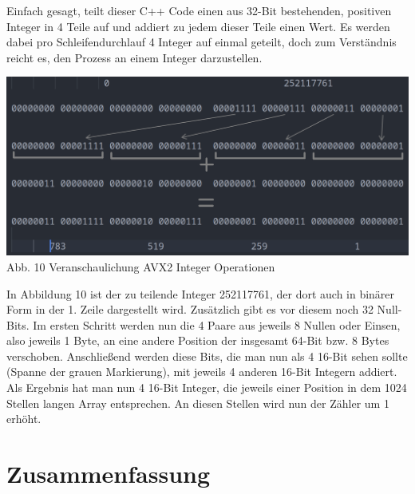 \documentclass[10pt,a4paper]{article}
\begin{document}
Einfach gesagt, teilt dieser C++ Code einen aus 32-Bit bestehenden, positiven Integer in 4 Teile auf und addiert
zu jedem dieser Teile einen Wert. Es werden dabei pro Schleifendurchlauf 4 Integer auf einmal geteilt, doch zum Verständnis reicht es,
den Prozess an einem Integer darzustellen.

\begin{center}
    \includegraphics[width=1\textwidth]{./diagramme/matplotlib/avx2explanationfull.png}
    Abb. 10 Veranschaulichung AVX2 Integer Operationen
\end{center}

In Abbildung 10 ist der zu teilende Integer 252117761, der dort auch in binärer Form in der 1. Zeile
dargestellt wird. Zusätzlich gibt es vor diesem noch 32 Null-Bits. Im ersten Schritt werden nun die 4
Paare aus jeweils 8 Nullen oder Einsen, also jeweils 1 Byte, an eine andere Position der insgesamt 64-Bit bzw. 8
Bytes verschoben. Anschließend werden diese Bits, die man nun als 4 16-Bit sehen sollte (Spanne der grauen Markierung),
mit jeweils 4 anderen 16-Bit Integern addiert. Als Ergebnis hat man nun 4 16-Bit Integer, die
jeweils einer Position in dem 1024 Stellen langen Array entsprechen. An diesen Stellen wird nun der Zähler
um 1 erhöht.

\clearpage

\section{Zusammenfassung}
\end{document}
